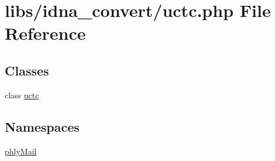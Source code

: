 \hypertarget{uctc_8php}{}\section{libs/idna\+\_\+convert/uctc.php File Reference}
\label{uctc_8php}
\subsection*{Classes}
\begin{DoxyCompactItemize}
\item 
class \hyperlink{classuctc}{uctc}
\end{DoxyCompactItemize}
\subsection*{Namespaces}
\begin{DoxyCompactItemize}
\item 
 \hyperlink{namespacephlyMail}{phly\+Mail}
\end{DoxyCompactItemize}
